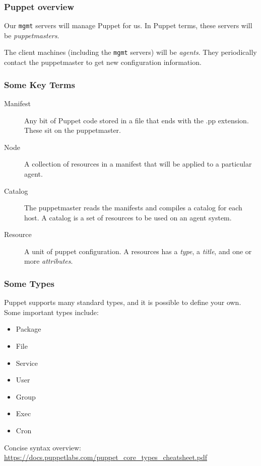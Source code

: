\documentclass[10pt]{beamer}
\begin{document}
\begin{frame}
  \frametitle{Puppet overview}

  Our \texttt{mgmt} servers will manage Puppet for us.  In Puppet terms, these servers will be \emph{puppetmasters}.
  
  The client machines (including the \texttt{mgmt} servers) will be \emph{agents}.  They periodically contact the puppetmaster to get new configuration information.
  
\end{frame}
\begin{frame}
  \frametitle{Some Key Terms}

 \begin{description}
  \item[Manifest] Any bit of Puppet code stored in a file that ends with the .pp extension.  These sit on the puppetmaster.
  \item[Node] A collection of resources in a manifest that will be applied to a particular agent.
  \item[Catalog] The puppetmaster reads the manifests and compiles a catalog for each host. A catalog is a set of resources to be used on an agent system.
  \item[Resource]A unit of puppet configuration.  A resources has a \emph{type}, a \emph{title}, and one or more \emph{attributes}.

  \end{description}

\end{frame}
\begin{frame}
  \frametitle{Some Types}

Puppet supports many standard types, and it is possible to define your own.  Some important types include:
\begin{itemize}
\item Package
\item File
\item Service
\item User
\item Group
\item Exec
\item Cron
\end{itemize}

\vspace{0.5cm}

Concise syntax overview: {\small \url{https://docs.puppetlabs.com/puppet_core_types_cheatsheet.pdf}}


\end{frame}
\end{document}
